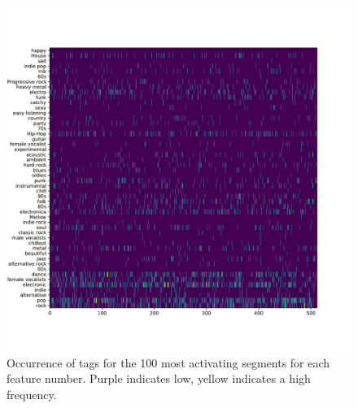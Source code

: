 \begin{figure}[h]
    \centering
    \includegraphics[width=\textwidth]{figs/features_tags_frequency.pdf}
    \caption{Occurrence of tags for the 100 most activating segments for each feature number. Purple indicates low, yellow indicates a high frequency.}
    \label{fig:tag_frequency}
\end{figure}
